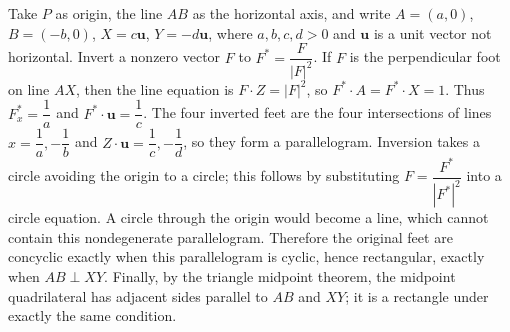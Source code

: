 Take $P$ as origin, the line $AB$ as the horizontal axis, and write $A=(a,0)$, $B=(-b,0)$, $X=c\mathbf u$, $Y=-d\mathbf u$, where $a,b,c,d>0$ and $\mathbf u$ is a unit vector not horizontal. Invert a nonzero vector $F$ to $F^*=\dfrac{F}{|F|^2}$. If $F$ is the perpendicular foot on line $AX$, then the line equation is $F\cdot Z=|F|^2$, so $F^*\cdot A=F^*\cdot X=1$. Thus $F^*_x=\dfrac{1}{a}$ and $F^*\cdot\mathbf u=\dfrac{1}{c}$. The four inverted feet are the four intersections of lines $x=\dfrac{1}{a},-\dfrac{1}{b}$ and $Z\cdot\mathbf u=\dfrac{1}{c},-\dfrac{1}{d}$, so they form a parallelogram. Inversion takes a circle avoiding the origin to a circle; this follows by substituting $F=\dfrac{F^*}{|F^*|^2}$ into a circle equation. A circle through the origin would become a line, which cannot contain this nondegenerate parallelogram. Therefore the original feet are concyclic exactly when this parallelogram is cyclic, hence rectangular, exactly when $AB\perp XY$. Finally, by the triangle midpoint theorem, the midpoint quadrilateral has adjacent sides parallel to $AB$ and $XY$; it is a rectangle under exactly the same condition.
